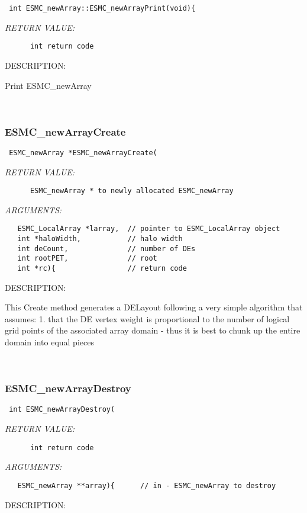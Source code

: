   
\begin{verbatim} int ESMC_newArray::ESMC_newArrayPrint(void){\end{verbatim}{\em RETURN VALUE:}
\begin{verbatim}      int return code\end{verbatim}
{\sf DESCRIPTION:\\ }


      Print ESMC\_newArray
   
 
\mbox{}\hrulefill\
 
\subsubsection [ESMC\_newArrayCreate] {ESMC\_newArrayCreate}


  
\begin{verbatim} ESMC_newArray *ESMC_newArrayCreate(\end{verbatim}{\em RETURN VALUE:}
\begin{verbatim}      ESMC_newArray * to newly allocated ESMC_newArray\end{verbatim}{\em ARGUMENTS:}
\begin{verbatim}   ESMC_LocalArray *larray,  // pointer to ESMC_LocalArray object
   int *haloWidth,           // halo width
   int deCount,              // number of DEs
   int rootPET,              // root
   int *rc){                 // return code\end{verbatim}
{\sf DESCRIPTION:\\ }


      This Create method generates a DELayout following a very simple
      algorithm that assumes:
        1. that the DE vertex weight is proportional to the number of logical
           grid points of the associated array domain - thus it is best to
           chunk up the entire domain into equal pieces 
 
\mbox{}\hrulefill\
 
\subsubsection [ESMC\_newArrayDestroy] {ESMC\_newArrayDestroy}


  
\begin{verbatim} int ESMC_newArrayDestroy(\end{verbatim}{\em RETURN VALUE:}
\begin{verbatim}      int return code\end{verbatim}{\em ARGUMENTS:}
\begin{verbatim}   ESMC_newArray **array){      // in - ESMC_newArray to destroy\end{verbatim}
{\sf DESCRIPTION:\\ }


